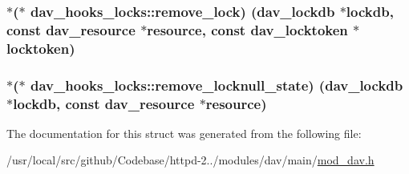 \subsubsection[{\texorpdfstring{remove\+\_\+lock}{remove_lock}}]{$\ast$($\ast$ dav\+\_\+hooks\+\_\+locks\+::remove\+\_\+lock) ({\bf dav\+\_\+lockdb} $\ast${\bf lockdb}, const {\bf dav\+\_\+resource} $\ast${\bf resource}, const {\bf dav\+\_\+locktoken} $\ast${\bf locktoken})}\hypertarget{structdav__hooks__locks_a7e107ff7a38040d0f01ff7143fad7c02}{}\label{structdav__hooks__locks_a7e107ff7a38040d0f01ff7143fad7c02}
\subsubsection[{\texorpdfstring{remove\+\_\+locknull\+\_\+state}{remove_locknull_state}}]{$\ast$($\ast$ dav\+\_\+hooks\+\_\+locks\+::remove\+\_\+locknull\+\_\+state) ({\bf dav\+\_\+lockdb} $\ast${\bf lockdb}, const {\bf dav\+\_\+resource} $\ast${\bf resource})}\hypertarget{structdav__hooks__locks_a222905b4adb2d8fe92cbfaa62c31900b}{}\label{structdav__hooks__locks_a222905b4adb2d8fe92cbfaa62c31900b}


The documentation for this struct was generated from the following file\+:\begin{DoxyCompactItemize}
\item 
/usr/local/src/github/\+Codebase/httpd-\/2../modules/dav/main/\hyperlink{mod__dav_8h}{mod\+\_\+dav.\+h}\end{DoxyCompactItemize}
